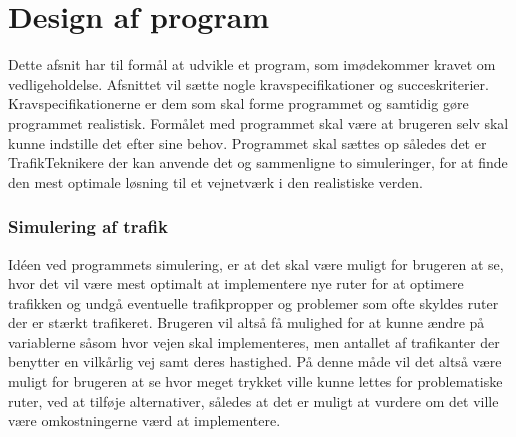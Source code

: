\chapter{Design af program}
Dette afsnit har til formål at udvikle et program, som imødekommer kravet om vedligeholdelse. Afsnittet vil sætte nogle kravspecifikationer og succeskriterier. Kravspecifikationerne er dem som skal forme programmet og samtidig gøre programmet realistisk. Formålet med programmet skal være at brugeren selv skal kunne indstille det efter sine behov. Programmet skal sættes op således det er TrafikTeknikere der kan anvende det og sammenligne to simuleringer, for at finde den mest optimale løsning til et vejnetværk i den realistiske verden. 


\subsection{Simulering af trafik}
Idéen ved programmets simulering, er at det skal være muligt for brugeren at se, hvor det vil være mest optimalt at implementere nye ruter for at optimere trafikken og undgå eventuelle trafikpropper og problemer som ofte skyldes ruter der er stærkt trafikeret. Brugeren vil altså få mulighed for at kunne ændre på variablerne såsom hvor vejen skal implementeres, men antallet af trafikanter der benytter en vilkårlig vej samt deres hastighed. På denne måde vil det altså være muligt for brugeren at se hvor meget trykket ville kunne lettes for problematiske ruter, ved at tilføje alternativer, således at det er muligt at vurdere om det ville være omkostningerne værd at implementere. 

